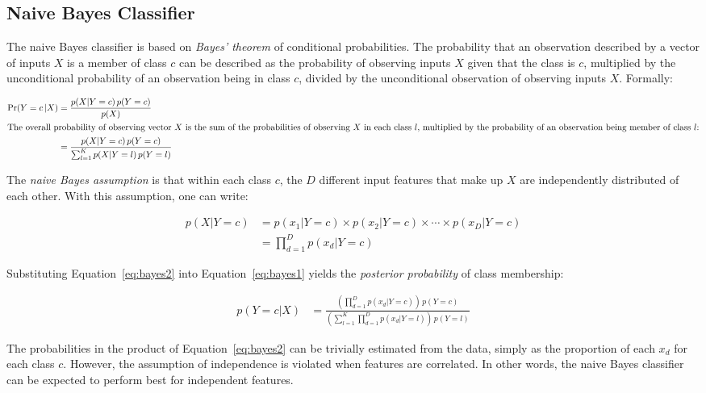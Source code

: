 \begin{advanced}
\subsection{Naive Bayes Classifier}

The naive Bayes classifier is based on \emph{Bayes' theorem} of conditional probabilities. The probability that an observation described by a vector of inputs $X$ is a member of class $c$ can be described as the probability of observing inputs $X$ given that the class is $c$, multiplied by the unconditional probability of an observation being in class $c$, divided by the unconditional observation of observing inputs $X$. Formally:

\begin{align}
\Pr(Y=c\, | X) &= \frac{p(X|Y=c)\, p(Y=c)}{p(X)} \nonumber \\
\intertext{The overall probability of observing vector $X$ is the sum of the probabilities of observing $X$ in each class $l$, multiplied by the probability of an observation being member of class $l$:}
&= \frac{p(X|Y=c)\,p(Y=c) }{\sum_{l=1}^K p(X|Y=l)\,p(Y=l)}  \label{eq:bayes1}
\end{align}

The \emph{naive Bayes assumption} is that within each class $c$, the $D$ different input features that make up $X$ are independently distributed of each other. With this assumption, one can write:

\begin{align}
p(X | Y=c ) &= p(x_1 | Y=c) \times p(x_2 | Y=c) \times \cdots \times p(x_D | Y=c) \nonumber \\
            &= \prod_{d=1}^D p(x_d | Y=c) \label{eq:bayes2}
\end{align}

\noindent Substituting Equation~\ref{eq:bayes2} into Equation~\ref{eq:bayes1} yields the \emph{posterior probability} of class membership:

\begin{align*}
p(Y=c|X) &= \frac{\left(\prod_{d=1}^D p(x_d | Y=c)\right) \, p(Y=c)}{\left(\sum_{l=1}^K \prod_{d=1}^D p(x_d | Y=l)\right) \, p(Y=l) } 
\end{align*}

The probabilities in the product of Equation~\ref{eq:bayes2} can be trivially estimated from the data, simply as the proportion of each $x_d$ for each class $c$. However, the assumption of independence is violated when features are correlated. In other words, the naive Bayes classifier can be expected to perform best for independent features.
\end{advanced}


